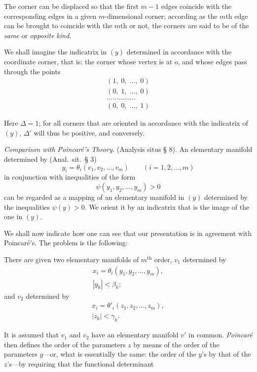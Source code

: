 \documentclass{article}
\begin{document}
The corner can be displaced so that the first $m - 1$ edges coincide with the corresponding edges in a given $m$-dimensional corner; according as the $m$th edge can be brought to coincide with the $m$th or not, the corners are said to be of the \emph{same} or \emph{opposite kind}.

We shall imagine the indicatrix in $(y)$ determined in accordance with the coordinate corner, that is: the corner whose vertex is at $o$, and whose edges pass through the points
\[
\begin{gathered}
(1, \; 0, \; \dots, \; 0) \\
(0, \; 1, \; \dots, \; 0) \\
\dots\dots\dots\dots\dots \\
(0, \; 0, \; \dots, \; 1)
\end{gathered}
\]

Here $\Delta = 1$; for all corners that are oriented in accordance with the indicatrix of $(y)$, $\Delta'$ will thus be positive, and conversely.

\emph{Comparison with Poincaré's Theory.} (Analysis situs § 8). An elementary manifold determined by (Anal.\ sit.\ § 3)
\[
y_i = \theta_i(v_1, v_2, \dots, v_m) \qquad (i = 1, 2, \dots, m)
\]
in conjunction with inequalities of the form
\[
\psi(y_1, y_2, \dots, y_m) > 0
\]
can be regarded as a mapping of an elementary manifold in $(y)$ determined by the inequalities $\psi(y) > 0$. We orient it by an indicatrix that is the image of the one in $(y)$.

We shall now indicate how one can see that our presentation is in agreement with Poincaré's. The problem is the following:

There are given two elementary manifolds of $m^{\text{th}}$ order, $v_1$ determined by
\[
\begin{gathered}
x_i = \theta_i(y_1, y_2, \dots, y_m), \tag{1} \\
|y_k| < \beta_k;
\end{gathered}
\]
and $v_2$ determined by
\[
\begin{gathered}
x_i = {\theta'}_i(z_1, z_2, \dots, z_m), \tag{2} \\
|z_k| < \gamma_k.
\end{gathered}
\]

It is assumed that $v_1$ and $v_2$ have an elementary manifold $v'$ in common. \emph{Poincaré} then defines the order of the parameters $z$ by means of the order of the parameters $y$---or, what is essentially the same: the order of the $y$'s by that of the $z$'s---by requiring that the functional determinant
\end{document}
